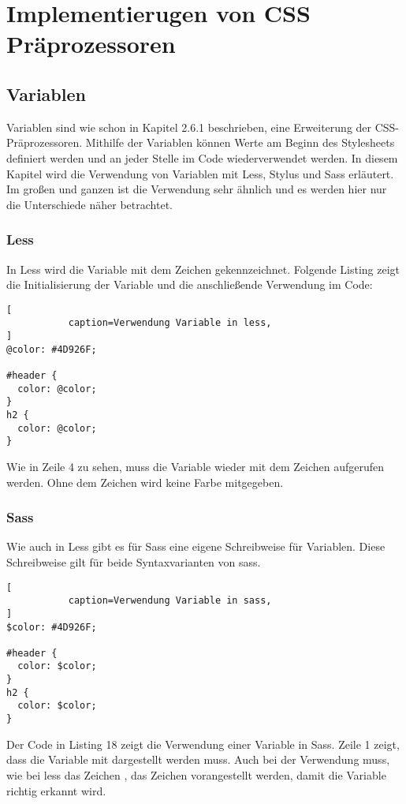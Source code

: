 \section{Implementierugen von CSS Präprozessoren}
\subsection{Variablen}
Variablen sind wie schon in Kapitel 2.6.1 beschrieben, eine Erweiterung der CSS-Präprozessoren. Mithilfe der Variablen können Werte am Beginn des Stylesheets definiert werden und an jeder Stelle im Code wiederverwendet werden. In diesem Kapitel wird die Verwendung von Variablen mit Less, Stylus und Sass erläutert. Im großen und ganzen ist die Verwendung sehr ähnlich und es werden hier nur die Unterschiede näher betrachtet.
\subsubsection{Less}
In Less wird die Variable mit dem Zeichen \grqq{} gekennzeichnet. Folgende Listing zeigt die Initialisierung der Variable und die anschließende Verwendung im Code:
\begin{lstlisting}[
           caption=Verwendung Variable in less,
]
@color: #4D926F;

#header {
  color: @color;
}
h2 {
  color: @color;
}
\end{lstlisting}
Wie in Zeile 4 zu sehen, muss die Variable wieder mit dem \grqq{} Zeichen aufgerufen werden. Ohne dem  \glqq{} Zeichen wird keine Farbe mitgegeben.
\subsubsection{Sass}
Wie auch in Less gibt es für Sass eine eigene Schreibweise für Variablen. Diese Schreibweise gilt für beide Syntaxvarianten von sass.
\begin{lstlisting}[
           caption=Verwendung Variable in sass,
]
$color: #4D926F;

#header {
  color: $color;
}
h2 {
  color: $color;
}
\end{lstlisting}
Der Code in Listing 18 zeigt die Verwendung einer Variable in Sass. Zeile 1 zeigt, dass die Variable mit \glqq{\$}\grqq{} dargestellt werden muss. Auch bei der Verwendung muss, wie bei less das Zeichen \grqq{}, das Zeichen \glqq{\$}\grqq{} vorangestellt werden, damit die Variable richtig erkannt wird.
